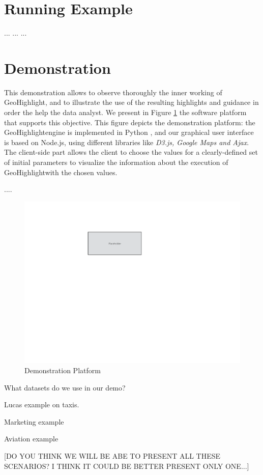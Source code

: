 \documentclass[conference]{IEEEtran}
\newcommand{\sys}{{\sc GeoHighlight}}
\begin{document}
\vspace{-5pt}
\section{Running Example}

...
...
...

\vspace{-5pt}
\section{Demonstration}

This demonstration allows to observe thoroughly the inner working of \sys, and to illustrate the use of the
resulting highlights and guidance in order the help the data analyst. We present in Figure \ref{fig:platform} the software platform that supports this objective. This figure depicts the demonstration platform: the \sys engine is implemented in Python \cite{}, and our graphical user interface is based on Node.js, using different libraries like \textit{D3.js, Google Maps and Ajax}.  The client-side part allows the client to choose the values for a clearly-defined set of initial parameters to visualize the information about the execution of \sys with the chosen values. 

....

 \begin{figure}[t]
   \centering
   \includegraphics[width=\columnwidth]{figs/placeholder}
 \caption{ Demonstration Platform}
 \label{fig:platform}
 \vspace{-10pt}
 \end{figure}

 What datasets do we use in our demo?

 Lucas example on taxis.

 Marketing example

 Aviation example 

[DO YOU THINK WE WILL BE ABE TO PRESENT ALL THESE SCENARIOS? I THINK IT COULD BE BETTER PRESENT ONLY ONE...]







\end{document}
